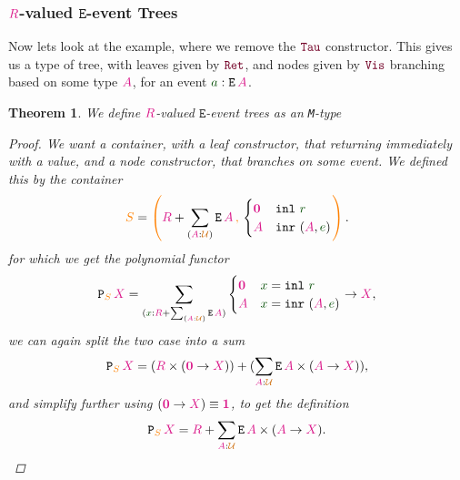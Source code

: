 \documentclass[twoside,11pt,openright]{report}
\theoremstyle{plain} %
\newtheorem{thm}{Theorem}[section]
\theoremstyle{definition}
\theoremstyle{remark}
\newcommand*{\term}[1]{\textcolor{green!30!black}{#1}} %
\newcommand*{\type}[1]{\textcolor{magenta!90!black}{#1}}
\newcommand*{\container}[1]{\textcolor{orange}{#1}}
\newcommand*{\containerpair}[2]{\ensuremath{\colorlet{savedleftcolor}{.}\color{orange}\left(\color{savedleftcolor}#1\,\textcolor{orange}{\mathbf{,}}\,#2\color{orange}\right)\color{savedleftcolor}}}
\newcommand*{\universe}[1]{\textcolor{orange!80!black}{#1}}
\newcommand*{\unit}{\type{\textbf{1}}}
\newcommand*{\empt}{\type{\textbf{0}}}
\newcommand*{\constructor}[1]{\textcolor{purple!60!black}{\ensuremath{\mathtt{#1}}}}
\newcommand*{\typeformer}[1]{\ensuremath{\mathtt{#1}}}
\newcommand*{\functor}[1]{\ensuremath{\mathbf{\mathtt{#1}}}}
\begin{document}
\subsubsection{\(\type{R}\)-valued \(\typeformer{E}\)-event Trees}
Now lets look at the example, where we remove the \(\constructor{Tau}\) constructor. This gives us a type of tree, with leaves given by \(\constructor{Ret}\), and nodes given by \(\constructor{Vis}\) branching based on some type \(\type{A}\), for an event \(\term{a} : \typeformer{E}\,\type{A}\). 
\begin{thm}
  We define \(\type{R}\)-valued \(\typeformer{E}\)-event trees as an \texttt{M}-type
  \begin{proof}
    We want a container, with a leaf constructor, that returning immediately with a value, and a node constructor, that branches on some event. We defined this by the container
  \begin{equation}
    \container{S} = \containerpair{\type{R} + \sum_{(\type{A} : \universe{\mathcal{U}})} \typeformer{E}\,\type{A}}{\begin{cases}\empt & \mathtt{inl}~\term{r} \\ \type{A} & \mathtt{inr}~(\type{A},\term{e})\end{cases}}.
  \end{equation}
for which we get the polynomial functor
\begin{equation}
  \functor{P}_{\container{S}}\,\type{X} = \sum_{(\term{x} : \type{R} + \sum_{(\type{A} : \universe{\mathcal{U}})} \typeformer{E}\,\type{A})} \begin{cases}\empt & \term{x} = \mathtt{inl}~\term{r} \\ \type{A} & \term{x} = \mathtt{inr}~(\type{A},\term{e})\end{cases} \rightarrow \type{X},
\end{equation}
we can again split the two case into a sum
\begin{equation}
  \functor{P}_{\container{S}}\,\type{X} = (\type{R} \times (\empt \rightarrow \type{X})) + (\sum_{\type{A} : \universe{\mathcal{U}}} \typeformer{E}\,\type{A} \times (\type{A} \rightarrow \type{X})),
\end{equation}
and simplify further using \((\empt \rightarrow \type{X}) \equiv \unit\), to get the definition
\begin{equation}
  \functor{P}_{\container{S}}\,\type{X} = \type{R} + \sum_{\type{A} : \universe{\mathcal{U}}} \typeformer{E}\,\type{A} \times (\type{A} \rightarrow \type{X}).
\end{equation}

\end{proof}
\end{thm}
\end{document}
